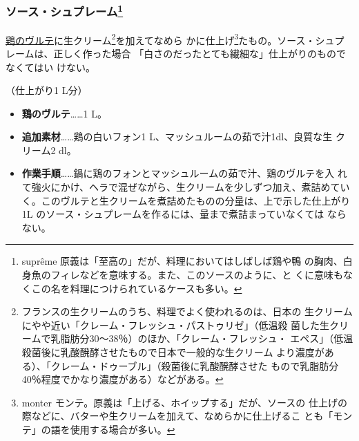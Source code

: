 \begin{recette}
\hypertarget{sauce-supreme}{%
\subsubsection[ソース・シュプレーム]{\texorpdfstring{ソース・シュプレーム\footnote{suprême
  原義は「至高の」だが、料理においてはしばしば鶏や鴨
  の胸肉、白身魚のフィレなどを意味する。また、このソースのように、と
  くに意味もなくこの名を料理につけられているケースも多い。}}{ソース・シュプレーム}}\label{sauce-supreme}}



\protect\hyperlink{veloute-de-volaille}{鶏のヴルテ}に生クリーム\footnote{フランスの生クリームのうち、料理でよく使われるのは、日本の
  生クリームにやや近い「クレーム・フレッシュ・パストゥリゼ」（低温殺
  菌した生クリームで乳脂肪分30〜38％）のほか、「クレーム・フレッシュ・
  エペス」（低温殺菌後に乳酸醗酵させたもので日本で一般的な生クリーム
  より濃度がある）、「クレーム・ドゥーブル」（殺菌後に乳酸醗酵させた
  もので乳脂肪分40％程度でかなり濃度がある）などがある。}を加えてなめら
かに仕上げ\footnote{monter
  モンテ。原義は「上げる、ホイップする」だが、ソースの
  仕上げの際などに、バターや生クリームを加えて、なめらかに仕上げるこ
  とも「モンテ」の語を使用する場合が多い。}たもの。ソース・シュプレームは、正しく作った場合
「白さのだったとても繊細な」仕上がりのものでなくてはい
けない。

（仕上がり1 L分）

\begin{itemize}
\item
  \textbf{鶏のヴルテ}\ldots{}\ldots{}1 L。
\item
  \textbf{追加素材}\ldots{}\ldots{}鶏の白いフォン1
  L、マッシュルームの茹で汁1dl、良質な生 クリーム2 \undemi{} dl。
\item
  \textbf{作業手順}\ldots{}\ldots{}鍋に鶏のフォンとマッシュルームの茹で汁、鶏のヴルテを入
  れて強火にかけ、ヘラで混ぜながら、生クリームを少しずつ加え、煮詰めてい
  く。このヴルテと生クリームを煮詰めたものの分量は、上で示した仕上がり1L
  のソース・シュプレームを作るには、\untiers{}量まで煮詰まっていなくては
  ならない。
\end{itemize}


\end{recette}
